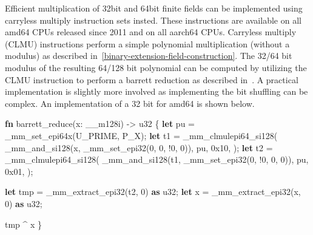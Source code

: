 \documentclass[
]{article}
\newenvironment{Shaded}{}{}
\newcommand{\DataTypeTok}[1]{\textcolor[rgb]{0.56,0.13,0.00}{#1}}
\newcommand{\DecValTok}[1]{\textcolor[rgb]{0.25,0.63,0.44}{#1}}
\newcommand{\KeywordTok}[1]{\textcolor[rgb]{0.00,0.44,0.13}{\textbf{#1}}}
\newcommand{\NormalTok}[1]{#1}
\newcommand{\OperatorTok}[1]{\textcolor[rgb]{0.40,0.40,0.40}{#1}}
\begin{document}
Efficient multiplication of 32bit and 64bit finite fields can be implemented using
carryless multiply instruction sets insted. These instructions are available on all amd64 CPUs released since 2011 and on all aarch64 CPUs. Carryless
multiply (CLMU) instructions perform a simple polynomial multiplication
(without a modulus) as described in~\cref{binary-extension-field-construction}. The 32/64
bit modulus of the resulting 64/128 bit polynomial can be computed by
utilizing the CLMU instruction to perform a barrett reduction as
described in~\cite{Dixon2009}. A practical
implementation is slightly more involved as implementing the bit
shuffling can be complex. An implementation of a 32 bit for amd64 is shown below.

\begin{Shaded}
\begin{Highlighting}[]
\KeywordTok{fn}\NormalTok{ barrett\_reduce(x}\OperatorTok{:} \NormalTok{\_\_m128i) }\OperatorTok{{-}\textgreater{}} \DataTypeTok{u32} \OperatorTok{\{}
    \KeywordTok{let}\NormalTok{ pu }\OperatorTok{=} \NormalTok{\_mm\_set\_epi64x(U\_PRIME}\OperatorTok{,}\NormalTok{ P\_X)}\OperatorTok{;}
    \KeywordTok{let}\NormalTok{ t1 }\OperatorTok{=} \NormalTok{\_mm\_clmulepi64\_si128(}
        \NormalTok{\_mm\_and\_si128(x}\OperatorTok{,} \NormalTok{\_mm\_set\_epi32(}\DecValTok{0}\OperatorTok{,} \DecValTok{0}\OperatorTok{,} \OperatorTok{!}\DecValTok{0}\OperatorTok{,} \DecValTok{0}\NormalTok{))}\OperatorTok{,}
\NormalTok{        pu}\OperatorTok{,}
        \DecValTok{0x10}\OperatorTok{,}
\NormalTok{    )}\OperatorTok{;}
    \KeywordTok{let}\NormalTok{ t2 }\OperatorTok{=} \NormalTok{\_mm\_clmulepi64\_si128(}
        \NormalTok{\_mm\_and\_si128(t1}\OperatorTok{,} \NormalTok{\_mm\_set\_epi32(}\DecValTok{0}\OperatorTok{,} \OperatorTok{!}\DecValTok{0}\OperatorTok{,} \DecValTok{0}\OperatorTok{,} \DecValTok{0}\NormalTok{))}\OperatorTok{,}
\NormalTok{        pu}\OperatorTok{,}
        \DecValTok{0x01}\OperatorTok{,}
\NormalTok{    )}\OperatorTok{;}

    \KeywordTok{let}\NormalTok{ tmp }\OperatorTok{=} \NormalTok{\_mm\_extract\_epi32(t2}\OperatorTok{,} \DecValTok{0}\NormalTok{) }\KeywordTok{as} \DataTypeTok{u32}\OperatorTok{;}
    \KeywordTok{let}\NormalTok{ x }\OperatorTok{=} \NormalTok{\_mm\_extract\_epi32(x}\OperatorTok{,} \DecValTok{0}\NormalTok{) }\KeywordTok{as} \DataTypeTok{u32}\OperatorTok{;}

\NormalTok{    tmp }\OperatorTok{\^{}}\NormalTok{ x}
\OperatorTok{\}}
\end{Highlighting}
\end{Shaded}
\end{document}
